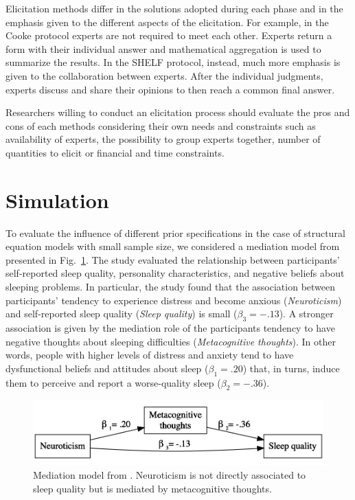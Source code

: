 \documentclass[graybox]{svmult}
\begin{document}
Elicitation methods differ in the solutions adopted during each phase and in the emphasis given to the different aspects of the elicitation. For example, in the Cooke protocol experts are not required to meet each other. Experts return a form with their individual answer and mathematical aggregation is used to summarize the results. In the SHELF protocol, instead, much more emphasis is given to the collaboration between experts. After the  individual judgments, experts discuss and share their opinions to then reach a common final answer.

Researchers willing to conduct an elicitation process should evaluate the pros and cons of each methods considering their own needs and constraints such as availability of experts, the possibility to group experts together, number of quantities to elicit or financial and time constraints.

\section{Simulation}
\label{sec:simulation}

To evaluate the influence of different prior specifications in the case of structural equation models with small sample size, we considered a mediation model from \cite{sellaPersonalityTraitsSleep2020}  presented in Fig.~\ref{fig:model_example}. The study evaluated the relationship between participants' self-reported sleep quality, personality characteristics, and negative beliefs about sleeping problems. In particular, the study found that the association between participants' tendency to experience distress and become anxious (\emph{Neuroticism}) and self-reported sleep quality (\emph{Sleep quality}) is small ($\beta_3=-.13$).  A stronger association is given  by the mediation role of the participants tendency to have negative thoughts about sleeping difficulties (\emph{Metacognitive thoughts}). In other words, people with higher levels of distress and anxiety tend to have dysfunctional beliefs and attitudes about sleep ($\beta_1=.20$) that, in turns, induce them to perceive and report a worse-quality sleep ($\beta_2=-.36$).

\begin{figure}[b]
	\sidecaption
	\label{fig:model_example}
	\includegraphics[width = .64\textwidth]{figure/Plot_example_model}
	\caption{Mediation model from \cite{sellaPersonalityTraitsSleep2020}. Neuroticism is not directly associated to sleep quality but is mediated by metacognitive thoughts.}
\end{figure}
\end{document}
